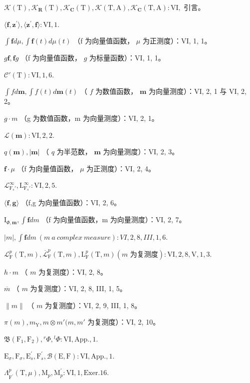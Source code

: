 \(\mathcal{K}(\mathrm{T}),\mathcal{K}_{\mathbf{R}}(\mathrm{T}),\mathcal{K}_{\mathbf{C}}(\mathrm{T}),\mathcal{K}(\mathrm{T},\mathrm{A}),\mathcal{K}_{\mathbf{C}}(\mathrm{T},\mathrm{A}):\mathrm{VI},\) 引言。

\(\langle \mathbf{f},\mathbf{z}^{\prime}\rangle ,\langle \mathbf{z}^{\prime},\mathbf{f}\rangle :\mathrm{VI},1.\)

\(\int \mathbf{f} d\mu, \int \mathbf{f}(t) d\mu(t)\) （f 为向量值函数， \(\mu\) 为正测度）：VI, 1, 1。

\(g\mathbf{f},\mathbf{f}g\) （f 为向量值函数， \(g\) 为标量函数）：VI, 1, 1。

\(\mathcal{C}'(\mathrm{T}) : \mathrm{VI}, 1, 6.\)

\(\int f d\mathbf{m}, \int f(t) d\mathbf{m}(t)\) （ \(f\) 为数值函数， \(\mathbf{m}\) 为向量测度）：VI, 2, 1 与 VI, 2, 2。

\(g \cdot m\) （g 为数值函数，m 为向量测度）：VI, 2, 1。

\(\mathcal{L}(\mathbf{m}) : \mathrm{VI}, 2, 2.\)

\(q(\mathbf{m}), |\mathbf{m}|\) （ \(q\) 为半范数， \(\mathbf{m}\) 为向量测度）：VI, 2, 3。

\(\mathbf{f} \cdot \mu\) （f 为向量值函数， \(\mu\) 为正测度）：VI, 2, 4。

\(\mathcal{L}_{\mathrm{F}_s'}^{\infty}, \mathrm{L}_{\mathrm{F}_s'}^{\infty} : \mathrm{VI}, 2, 5.\)

\(\langle \mathbf{f},\mathbf{g}\rangle\) （f,g 为向量值函数）：VI, 2, 6。

\(\mathrm{I}_{\Phi ,\mathbf{m}},\int \mathbf{f}dm\) （f 为向量值函数，m 为向量测度）：VI, 2, 7。

\(|m|, \int \mathbf{f} dm \ (m \ a \ complex \ measure) : VI, 2, 8, III, 1, 6.\)

\(\mathcal{L}_{\mathrm{F}}^{p}(\mathrm{T},m), \overline{\mathcal{L}}_{\mathrm{F}}^{p}(\mathrm{T},m), \mathrm{L}_{\mathrm{F}}^{p}(\mathrm{T},m) (m \text{ 为复测度}): \mathrm{VI}, 2, 8, \mathrm{V}, 1, 3.\)

\(h \cdot m\) （ \(m\) 为复测度）：VI, 2, 8。

\(\overline{m}\) （ \(m\) 为复测度）：VI, 2, 8, III, 1, 5。

\(\| m\|\) （ \(m\) 为复测度）：VI, 2, 9, III, 1, 8。

\(\pi (m), m_{\mathrm{Y}}, m \otimes m' (m, m'\) 为复测度）：VI, 2, 10。

\(\mathfrak{B}(\mathrm{F}_{1},\mathrm{F}_{2}),{}^{r}\Phi,{}^{l}\Phi :\mathrm{VI},\mathrm{App.},1.\)

\(\mathrm{E}_{\sigma}, \mathrm{F}_{\sigma}, \mathrm{E}_{s}^{\prime}, \mathrm{F}_{s}^{\prime}, \mathcal{B}(\mathrm{E}, \mathrm{F}) : \mathrm{VI}, \mathrm{App.}, 1.\)

\(\Lambda_{\mathrm{F}^{\prime}}^{p}(\mathrm{T},\mu),\mathrm{M}_{p},\mathrm{M}_{p}^{\prime}:\mathrm{VI},1,\mathrm{Exer.}16.\)
\relax{}
